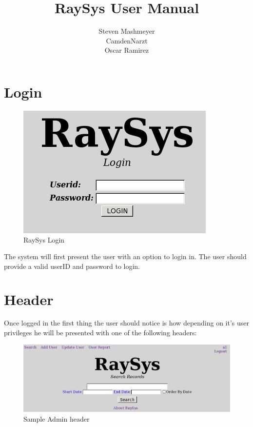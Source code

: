 \documentclass[11pt]{report}
\title{RaySys User Manual}
\author{Steven Mashmeyer\\CamdenNarzt\\Oscar Ramirez}
\begin{document}
\maketitle

\chapter*{Login}
\begin{figure}[htb]
  \begin{center}
    \includegraphics[scale=0.55]{imgs/login.png}
    \caption{RaySys Login}
    \label{fig:login}
  \end{center}
\end{figure}

The system will first present the user with an option to login in. The user should provide a valid userID and password to login.

\chapter*{Header}
Once logged in the first thing the user should notice is how depending on it's user privileges he will be presented with one of the following headers:

\begin{figure}[htb]
  \begin{center}
    \includegraphics[scale=0.50]{imgs/adminheader.png}
    \caption{Sample Admin header}
    \label{fig:adminh}
  \end{center}
\end{figure}
\end{document}
